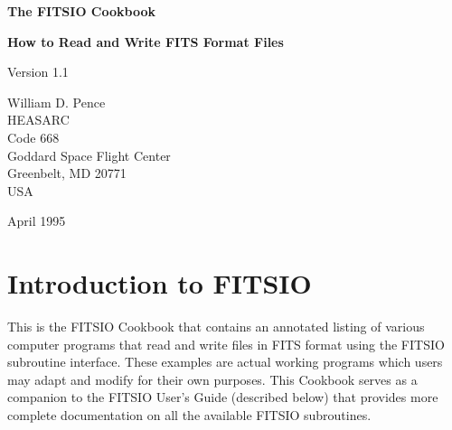 %
\oddsidemargin=0.25in
\evensidemargin=0.00in
\textwidth=6.0in
\topmargin=0.0in
\textheight=8.75in
\parindent=0cm
\parskip=0.2cm


\begin{titlepage}
\normalsize
\vspace*{4.6cm}
\begin{center}
{\Huge \bf The FITSIO Cookbook}\\
\end{center}
\medskip 
\medskip 
\medskip 
\medskip 
\begin{center}
{\LARGE \bf How to Read and Write FITS Format Files}\\
\end{center}
\medskip
\medskip
\medskip
\medskip
\begin{center}
{\Large Version 1.1\\}
\end{center}
\bigskip
\vskip 3.0cm
\begin{center}
{William D. Pence\\
HEASARC\\
Code 668\\
Goddard Space Flight Center\\
Greenbelt, MD 20771\\
USA}
\end{center}

\vfill
\bigskip
\begin{center}
{\Large April 1995\\}
\end{center}
\vfill
\end{titlepage}

\begin{titlepage}
\vspace*{7.6cm}
\vfill
\end{titlepage}


\tableofcontents

\chapter{Introduction to FITSIO}

This is the FITSIO Cookbook that contains an annotated listing of
various computer programs that read and write files in FITS format
using the FITSIO subroutine interface.  These examples are actual
working programs which users may adapt and modify for their own
purposes.  This Cookbook serves as a companion to the FITSIO User's
Guide (described below) that provides more complete documentation on all the
available FITSIO subroutines.

